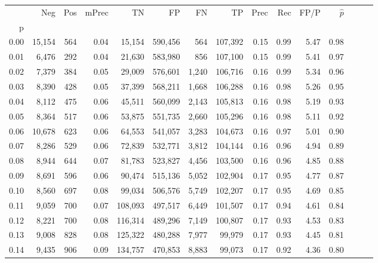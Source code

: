 \begin{tabular}{rrrrrrrrrrrrrrr}
\toprule
{} &     Neg &    Pos & mPrec &       TN &       FP &       FN &       TP &  Prec &   Rec &  FP/P & $\hat{p}$ \\
p    &         &        &       &          &          &          &          &       &       &       &           \\
\midrule
0.00 &  15,154 &    564 &  0.04 &   15,154 &  590,456 &      564 &  107,392 &  0.15 &  0.99 &  5.47 &      0.98 \\
0.01 &   6,476 &    292 &  0.04 &   21,630 &  583,980 &      856 &  107,100 &  0.15 &  0.99 &  5.41 &      0.97 \\
0.02 &   7,379 &    384 &  0.05 &   29,009 &  576,601 &    1,240 &  106,716 &  0.16 &  0.99 &  5.34 &      0.96 \\
0.03 &   8,390 &    428 &  0.05 &   37,399 &  568,211 &    1,668 &  106,288 &  0.16 &  0.98 &  5.26 &      0.95 \\
0.04 &   8,112 &    475 &  0.06 &   45,511 &  560,099 &    2,143 &  105,813 &  0.16 &  0.98 &  5.19 &      0.93 \\
0.05 &   8,364 &    517 &  0.06 &   53,875 &  551,735 &    2,660 &  105,296 &  0.16 &  0.98 &  5.11 &      0.92 \\
0.06 &  10,678 &    623 &  0.06 &   64,553 &  541,057 &    3,283 &  104,673 &  0.16 &  0.97 &  5.01 &      0.90 \\
0.07 &   8,286 &    529 &  0.06 &   72,839 &  532,771 &    3,812 &  104,144 &  0.16 &  0.96 &  4.94 &      0.89 \\
0.08 &   8,944 &    644 &  0.07 &   81,783 &  523,827 &    4,456 &  103,500 &  0.16 &  0.96 &  4.85 &      0.88 \\
0.09 &   8,691 &    596 &  0.06 &   90,474 &  515,136 &    5,052 &  102,904 &  0.17 &  0.95 &  4.77 &      0.87 \\
0.10 &   8,560 &    697 &  0.08 &   99,034 &  506,576 &    5,749 &  102,207 &  0.17 &  0.95 &  4.69 &      0.85 \\
0.11 &   9,059 &    700 &  0.07 &  108,093 &  497,517 &    6,449 &  101,507 &  0.17 &  0.94 &  4.61 &      0.84 \\
0.12 &   8,221 &    700 &  0.08 &  116,314 &  489,296 &    7,149 &  100,807 &  0.17 &  0.93 &  4.53 &      0.83 \\
0.13 &   9,008 &    828 &  0.08 &  125,322 &  480,288 &    7,977 &   99,979 &  0.17 &  0.93 &  4.45 &      0.81 \\
0.14 &   9,435 &    906 &  0.09 &  134,757 &  470,853 &    8,883 &   99,073 &  0.17 &  0.92 &  4.36 &      0.80 \\

\end{tabular}

